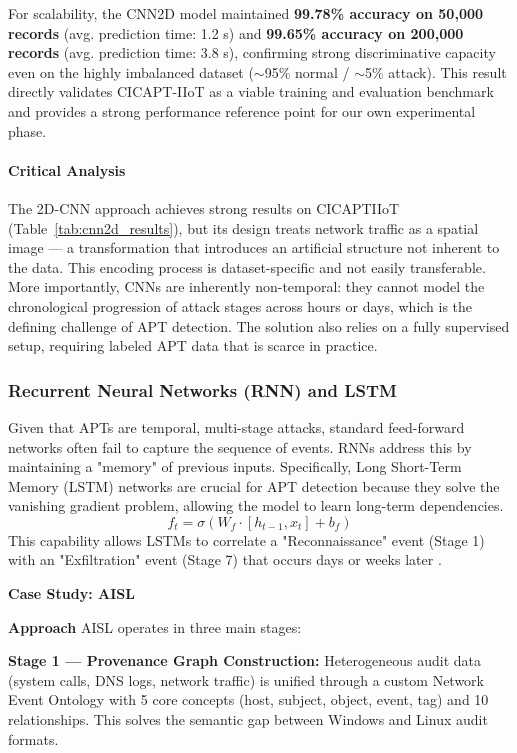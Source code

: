 For scalability, the CNN2D model maintained \textbf{99.78\% accuracy on 50,000 records} (avg. prediction time: 1.2 s) and \textbf{99.65\% accuracy on 200,000 records} (avg. prediction time: 3.8 s), confirming strong discriminative capacity even on the highly imbalanced dataset ($\sim$95\% normal / $\sim$5\% attack). This result directly validates CICAPT-IIoT \cite{ghiasvand2024cicapt} as a viable training and evaluation benchmark and provides a strong performance reference point for our own experimental phase.

\paragraph{Critical Analysis}
The 2D-CNN approach achieves strong results on CICAPTIIoT (Table~\ref{tab:cnn2d_results}), but its design treats network traffic as a spatial image — a transformation that introduces an artificial structure not inherent to the data. This encoding process is dataset-specific and not easily transferable. More importantly, CNNs are inherently non-temporal: they cannot model the chronological progression of attack stages across hours or days, which is the defining challenge of APT detection. The solution also relies on a fully supervised setup, requiring labeled APT data that is scarce in practice.

\subsubsection{Recurrent Neural Networks (RNN) and LSTM}
Given that APTs are temporal, multi-stage attacks, standard feed-forward networks often fail to capture the sequence of events. RNNs address this by maintaining a "memory" of previous inputs. Specifically, Long Short-Term Memory (LSTM) networks are crucial for APT detection because they solve the vanishing gradient problem, allowing the model to learn long-term dependencies.
\begin{equation}
    f_t = \sigma(W_f \cdot [h_{t-1}, x_t] + b_f)
\end{equation}
This capability allows LSTMs to correlate a "Reconnaissance" event (Stage 1) with an "Exfiltration" event (Stage 7) that occurs days or weeks later \cite{ankalaki2025cyber}.

\textbf{Case Study: AISL \cite{yue2024aisl}}

\textbf{Approach}
AISL operates in three main stages:

\textbf{Stage 1 --- Provenance Graph Construction:} Heterogeneous audit data (system calls, DNS logs, network traffic) is unified through a custom Network Event Ontology with 5 core concepts (host, subject, object, event, tag) and 10 relationships. This solves the semantic gap between Windows and Linux audit formats.

